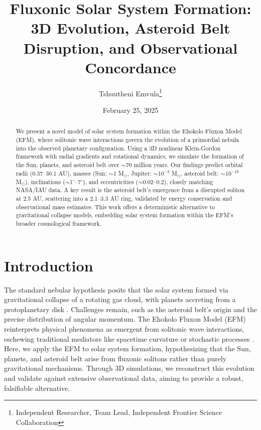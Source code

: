 \documentclass[11pt]{article}
\title{Fluxonic Solar System Formation: 3D Evolution, Asteroid Belt Disruption, and Observational Concordance}
\author{Tshuutheni Emvula\thanks{Independent Researcher, Team Lead, Independent Frontier Science Collaboration}}
\date{February 25, 2025}
\begin{document}
\maketitle

\begin{abstract}
We present a novel model of solar system formation within the Ehokolo Fluxon Model (EFM), where solitonic wave interactions govern the evolution of a primordial nebula into the observed planetary configuration. Using a 3D nonlinear Klein-Gordon framework with radial gradients and rotational dynamics, we simulate the formation of the Sun, planets, and asteroid belt over $\sim$70 million years. Our findings predict orbital radii (0.37--30.1 AU), masses (Sun: $\sim$1 M$_\odot$, Jupiter: $\sim$10$^{-3}$ M$_\odot$, asteroid belt: $\sim$10$^{-10}$ M$_\odot$), inclinations ($\sim$1$^\circ$--7$^\circ$), and eccentricities ($\sim$0.02--0.2), closely matching NASA/IAU data. A key result is the asteroid belt’s emergence from a disrupted soliton at 2.5 AU, scattering into a 2.1--3.3 AU ring, validated by energy conservation and observational mass estimates. This work offers a deterministic alternative to gravitational collapse models, embedding solar system formation within the EFM’s broader cosmological framework.
\end{abstract}

\section{Introduction}
The standard nebular hypothesis posits that the solar system formed via gravitational collapse of a rotating gas cloud, with planets accreting from a protoplanetary disk \citep{kant1755,laplace1796}. Challenges remain, such as the asteroid belt’s origin and the precise distribution of angular momentum. The Ehokolo Fluxon Model (EFM) reinterprets physical phenomena as emergent from solitonic wave interactions, eschewing traditional mediators like spacetime curvature or stochastic processes \citep{emvula2025compendium}. Here, we apply the EFM to solar system formation, hypothesizing that the Sun, planets, and asteroid belt arise from fluxonic solitons rather than purely gravitational mechanisms. Through 3D simulations, we reconstruct this evolution and validate against extensive observational data, aiming to provide a robust, falsifiable alternative.
\end{document}
